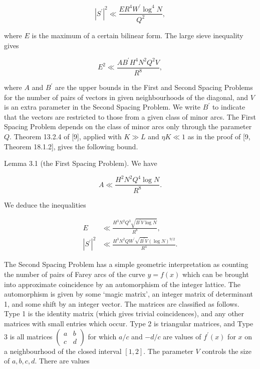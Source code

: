 \documentclass[10pt]{article}
\begin{document}
\begin{equation*}
\left|S^{\prime}\right|^{2} \ll \frac{E R^{4} W^{\prime} \log ^{4} N}{Q^{2}}, \tag{3.1}
\end{equation*}


where $E$ is the maximum of a certain bilinear form. The large sieve inequality gives


\begin{equation*}
E^{2} \ll \frac{A B^{\prime} H^{4} N^{2} Q^{2} V}{R^{8}}, \tag{3.2}
\end{equation*}


where $A$ and $B^{\prime}$ are the upper bounds in the First and Second Spacing Problems for the number of pairs of vectors in given neighbourhoods of the diagonal, and $V$ is an extra parameter in the Second Spacing Problem. We write $B^{\prime}$ to indicate that the vectors are restricted to those from a given class of minor arcs. The First Spacing Problem depends on the class of minor arcs only through the parameter $Q$. Theorem 13.2.4 of [9], applied with $K \gg L$ and $\eta K \ll 1$ as in the proof of [9, Theorem 18.1.2], gives the following bound.

Lemma 3.1 (the First Spacing Problem). We have


\begin{equation*}
A \ll \frac{H^{2} N^{2} Q^{4} \log N}{R^{8}}. \tag{3.3}
\end{equation*}


We deduce the inequalities


\begin{equation*}
\begin{aligned}
E &\ll \frac{H^{3} N^{2} Q^{3} \sqrt{B^{\prime} V \log N}}{R^{8}}, \\
\left|S^{\prime}\right|^{2} &\ll \frac{H^{3} N^{2} Q W^{\prime} \sqrt{B^{\prime} V}(\log N)^{9 / 2}}{R^{4}}.
\end{aligned} \tag{3.4}
\end{equation*}


The Second Spacing Problem has a simple geometric interpretation as counting the number of pairs of Farey arcs of the curve $y=f(x)$ which can be brought into approximate coincidence by an automorphism of the integer lattice. The automorphism is given by some `magic matrix', an integer matrix of determinant 1, and some shift by an integer vector. The matrices are classified as follows. Type 1 is the identity matrix (which gives trivial coincidences), and any other matrices with small entries which occur. Type 2 is triangular matrices, and Type 3 is all matrices $\left(\begin{array}{cc}a & b \\ c & d\end{array}\right)$ for which $a / c$ and $-d / c$ are values of $f^{\prime}(x)$ for $x$ on a neighbourhood of the closed interval $[1,2]$. The parameter $V$ controls the size of $a, b, c, d$. There are values
\end{document}

